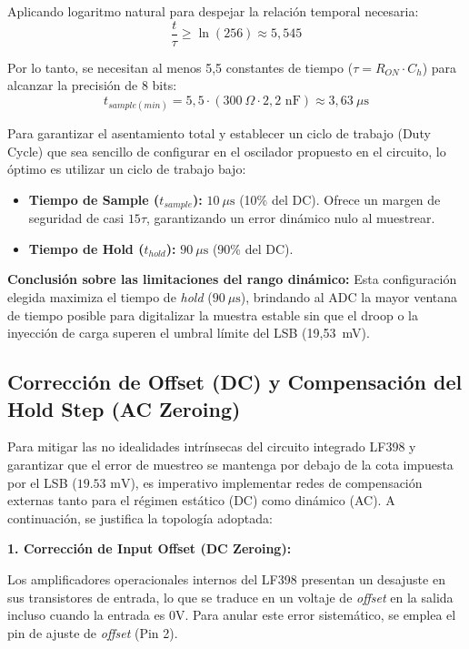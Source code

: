\begin{enumerate}
	Aplicando logaritmo natural para despejar la relación temporal necesaria:
	\begin{equation}
		\frac{t}{\tau} \ge \ln(256) \approx 5,545
	\end{equation}
	
	Por lo tanto, se necesitan al menos 5,5 constantes de tiempo ($\tau = R_{ON} \cdot C_h$) para alcanzar la precisión de 8 bits:
	\begin{equation}
		t_{sample(min)} = 5,5 \cdot (300\ \Omega \cdot 2,2\text{ nF}) \approx 3,63\ \mu\text{s}
	\end{equation}
	
	Para garantizar el asentamiento total y establecer un ciclo de trabajo (Duty Cycle) que sea sencillo de configurar en el oscilador propuesto en el circuito, lo óptimo es utilizar un ciclo de trabajo bajo:
	
	\begin{itemize}
		\item \textbf{Tiempo de Sample ($t_{sample}$):} $10\ \mu\text{s}$ (10\% del DC). Ofrece un margen de seguridad de casi $15\tau$, garantizando un error dinámico nulo al muestrear.
		\item \textbf{Tiempo de Hold ($t_{hold}$):} $90\ \mu\text{s}$ (90\% del DC).
	\end{itemize}
\end{enumerate}

\textbf{Conclusión sobre las limitaciones del rango dinámico:} Esta configuración elegida maximiza el tiempo de \textit{hold} ($90\ \mu\text{s}$), brindando al ADC la mayor ventana de tiempo posible para digitalizar la muestra estable sin que el droop o la inyección de carga superen el umbral límite del LSB (19,53~mV).
\newpage
\subsection{Corrección de Offset (DC) y Compensación del Hold Step (AC Zeroing)}

Para mitigar las no idealidades intrínsecas del circuito integrado LF398 y garantizar que el error de muestreo se mantenga por debajo de la cota impuesta por el LSB ($19.53\text{ mV}$), es imperativo implementar redes de compensación externas tanto para el régimen estático (DC) como dinámico (AC). A continuación, se justifica la topología adoptada:

\textbf{1. Corrección de Input Offset (DC Zeroing):}

Los amplificadores operacionales internos del LF398 presentan un desajuste en sus transistores de entrada, lo que se traduce en un voltaje de \textit{offset} en la salida incluso cuando la entrada es $0\text{V}$. Para anular este error sistemático, se emplea el pin de ajuste de \textit{offset} (Pin 2).

